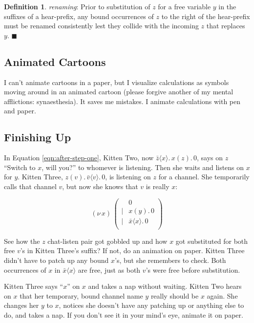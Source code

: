 \documentclass[10pt,oneside,x11names]{article}
\newcommand\napping    [0]{0}
\newcommand\chatting   [3]{\bar{#1}\langle{#2}\rangle{}.\,#3}
\newcommand\listening  [3]{#1(#2).\,#3}
\newcommand\whispering [2]{(\nu\,#1)\,{#2}}
\newcommand{\kitThree}{\listening{z}{v}{\chatting{v}{v}{\napping}}}
\theoremstyle{definition}
\newtheorem{definition}{Definition}
\theoremstyle{warning}
\begin{document}
\label{def:renaming}
\begin{definition}{\emph{renaming}:}
  Prior to substitution of $z$ for a free variable $y$ in the suffixes of
  a hear-prefix,
  any bound occurrences of $z$ to the right of the hear-prefix must be
  renamed consistently lest they collide with the incoming $z$
  that replaces $y$. $\blacksquare$
\end{definition}

\subsection{Animated Cartoons}
\label{sec:org6434a09}

I can't animate cartoons in a paper, but I visualize
calculations as symbols moving around in an animated cartoon
(please forgive another of my mental afflictions:
synaesthesia). It saves me mistakes. I animate calculations
with pen and paper.

\subsection{Finishing Up}
\label{sec:orgc70cf4d}

In Equation \ref{eqn:after-step-one}, Kitten Two, now
\(\chatting{z}{x}{\listening{x}{z}{\napping}}\), says on \(z\)
``Switch to \(x\), will you?'' to whomever is listening. Then she
waits and listens on \(x\) for \(y\). Kitten Three, \(\kitThree\), is
listening on \(z\) for a channel. She temporarily calls that
channel \(v\), but now she knows that \(v\) is really \(x\):

\begin{equation}
\whispering{x}{\left(
\begin{array}{clll}
 {}     & \napping  \\
 \vert  & {\listening{x}{y}{\napping}} \\
 \vert  & {\chatting{x}{x}{\napping}} \\
\end{array}\right)}
\end{equation}

See how the \(z\) chat-listen pair got gobbled up and how \(x\)
got substituted for both free \(v\)'s in Kitten Three's suffix?
If not, do an animation on paper. Kitten Three didn't have to
patch up any bound \(x\)'s, but she remembers to check. Both
occurrences of \(x\) in \(\bar{x}\langle{x}\rangle\) are free,
just as both \(v\)'s were free before substitution.

Kitten Three says ``\(x\)'' on \(x\) and takes a nap without
waiting. Kitten Two hears on \(x\) that her temporary, bound
channel name \(y\) really should be \(x\) again. She changes her
\(y\) to \(x\), notices she doesn't have any patching up or
anything else to do, and takes a nap. If you don't see it in
your mind's eye, animate it on paper.
\end{document}
